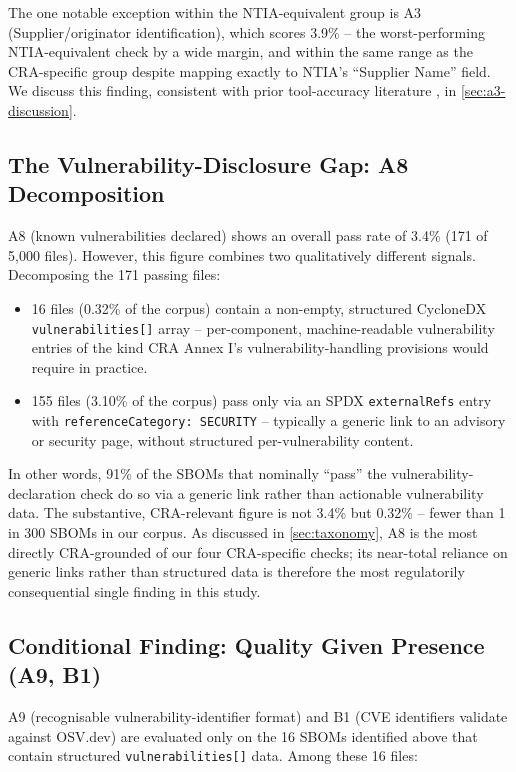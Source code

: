 \documentclass[11pt]{article}
\begin{document}
The one notable exception within the NTIA-equivalent group is A3 (Supplier/originator identification), which scores 3.9\% -- the worst-performing NTIA-equivalent check by a wide margin, and within the same range as the CRA-specific group despite mapping exactly to NTIA's ``Supplier Name'' field. We discuss this finding, consistent with prior tool-accuracy literature \cite{muneza2025,halbritter2024}, in \cref{sec:a3-discussion}.

\subsection{The Vulnerability-Disclosure Gap: A8 Decomposition}
\label{sec:a8-decomp}

A8 (known vulnerabilities declared) shows an overall pass rate of 3.4\% (171 of 5,000 files). However, this figure combines two qualitatively different signals. Decomposing the 171 passing files:

\begin{itemize}
\item 16 files (0.32\% of the corpus) contain a non-empty, structured CycloneDX \texttt{vulnerabilities[]} array -- per-component, machine-readable vulnerability entries of the kind CRA Annex I's vulnerability-handling provisions would require in practice.
\item 155 files (3.10\% of the corpus) pass only via an SPDX \texttt{externalRefs} entry with \texttt{referenceCategory: SECURITY} -- typically a generic link to an advisory or security page, without structured per-vulnerability content.
\end{itemize}

In other words, 91\% of the SBOMs that nominally ``pass'' the vulnerability-declaration check do so via a generic link rather than actionable vulnerability data. The substantive, CRA-relevant figure is not 3.4\% but 0.32\% -- fewer than 1 in 300 SBOMs in our corpus. As discussed in \cref{sec:taxonomy}, A8 is the most directly CRA-grounded of our four CRA-specific checks; its near-total reliance on generic links rather than structured data is therefore the most regulatorily consequential single finding in this study.

\subsection{Conditional Finding: Quality Given Presence (A9, B1)}
\label{sec:conditional}

A9 (recognisable vulnerability-identifier format) and B1 (CVE identifiers validate against OSV.dev) are evaluated only on the 16 SBOMs identified above that contain structured \texttt{vulnerabilities[]} data. Among these 16 files:
\end{document}
